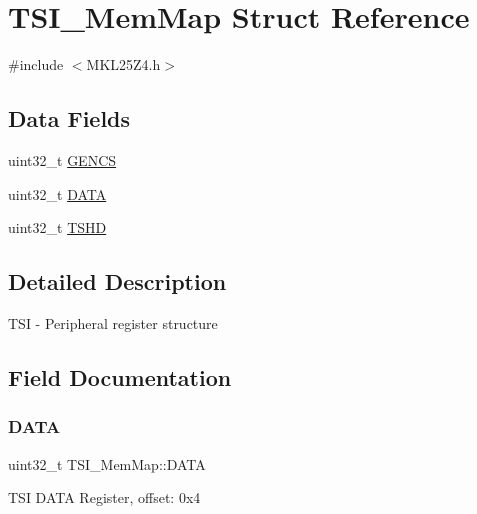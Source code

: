 \hypertarget{struct_t_s_i___mem_map}{}\section{T\+S\+I\+\_\+\+Mem\+Map Struct Reference}
\label{struct_t_s_i___mem_map}


{\ttfamily \#include $<$M\+K\+L25\+Z4.\+h$>$}

\subsection*{Data Fields}
\begin{DoxyCompactItemize}
\item 
uint32\+\_\+t \hyperlink{struct_t_s_i___mem_map_a14380d508e161af3b794962e7c3f8abb}{G\+E\+N\+CS}
\item 
uint32\+\_\+t \hyperlink{struct_t_s_i___mem_map_af21190d34aa787d4660144470b71ad90}{D\+A\+TA}
\item 
uint32\+\_\+t \hyperlink{struct_t_s_i___mem_map_aeede6a8023aabcd9c6fff71419ae4cce}{T\+S\+HD}
\end{DoxyCompactItemize}


\subsection{Detailed Description}
T\+SI -\/ Peripheral register structure 

\subsection{Field Documentation}
\mbox{\label{struct_t_s_i___mem_map_af21190d34aa787d4660144470b71ad90}} 
\subsubsection{\texorpdfstring{D\+A\+TA}{DATA}}
{\footnotesize\ttfamily uint32\+\_\+t T\+S\+I\+\_\+\+Mem\+Map\+::\+D\+A\+TA}

T\+SI D\+A\+TA Register, offset\+: 0x4 \mbox{\label{struct_t_s_i___mem_map_a14380d508e161af3b794962e7c3f8abb}} 

